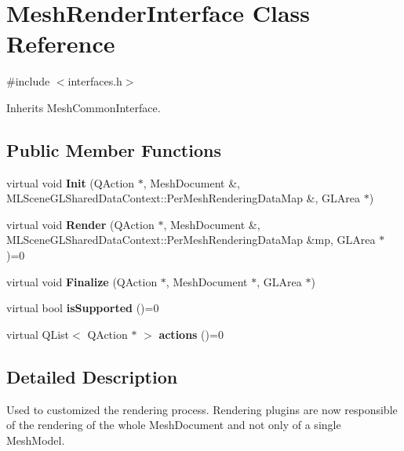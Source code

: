\hypertarget{class_mesh_render_interface}{}\section{Mesh\+Render\+Interface Class Reference}
\label{class_mesh_render_interface}


{\ttfamily \#include $<$interfaces.\+h$>$}



Inherits Mesh\+Common\+Interface.

\subsection*{Public Member Functions}
\begin{DoxyCompactItemize}
\item 
\mbox{\label{class_mesh_render_interface_a6a66ca17371479cb2bf6fedc7a3789f3}} 
virtual void {\bfseries Init} (Q\+Action $\ast$, Mesh\+Document \&, M\+L\+Scene\+G\+L\+Shared\+Data\+Context\+::\+Per\+Mesh\+Rendering\+Data\+Map \&, G\+L\+Area $\ast$)
\item 
\mbox{\label{class_mesh_render_interface_a6e1b4e2e6b8f665e66521bf5cb0ac513}} 
virtual void {\bfseries Render} (Q\+Action $\ast$, Mesh\+Document \&, M\+L\+Scene\+G\+L\+Shared\+Data\+Context\+::\+Per\+Mesh\+Rendering\+Data\+Map \&mp, G\+L\+Area $\ast$)=0
\item 
\mbox{\label{class_mesh_render_interface_ada3e4ab4ce11bb0a14a9643b0f7927cf}} 
virtual void {\bfseries Finalize} (Q\+Action $\ast$, Mesh\+Document $\ast$, G\+L\+Area $\ast$)
\item 
\mbox{\label{class_mesh_render_interface_ab660f9bd5ab26b8278c137befc289e43}} 
virtual bool {\bfseries is\+Supported} ()=0
\item 
\mbox{\label{class_mesh_render_interface_abed900d01387bfb0f3c0c0b0224ee1d4}} 
virtual Q\+List$<$ Q\+Action $\ast$ $>$ {\bfseries actions} ()=0
\end{DoxyCompactItemize}


\subsection{Detailed Description}
Used to customized the rendering process. Rendering plugins are now responsible of the rendering of the whole Mesh\+Document and not only of a single Mesh\+Model.

